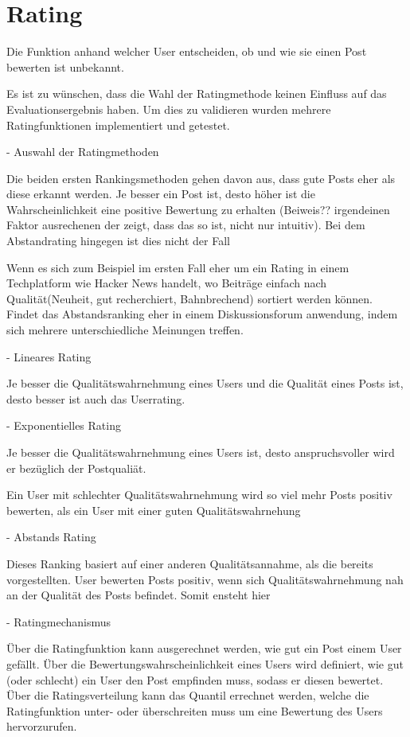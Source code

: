 \chapter{Rating}


Die Funktion anhand welcher User entscheiden, ob und wie sie einen Post bewerten ist unbekannt. 

Es ist zu wünschen, dass die Wahl der Ratingmethode keinen Einfluss auf das Evaluationsergebnis haben.
Um dies zu validieren wurden mehrere Ratingfunktionen implementiert und getestet.

 


- Auswahl der Ratingmethoden


Die beiden ersten Rankingsmethoden gehen davon aus, dass gute Posts eher als diese erkannt werden. Je besser ein Post ist, desto höher ist die Wahrscheinlichkeit eine positive Bewertung zu erhalten (Beiweis?? irgendeinen Faktor ausrechenen der zeigt, dass das so ist, nicht nur intuitiv). Bei dem Abstandrating hingegen ist dies nicht der Fall

Wenn es sich zum Beispiel im ersten Fall eher um ein Rating in einem Techplatform wie Hacker News handelt, wo Beiträge einfach nach Qualität(Neuheit, gut recherchiert, Bahnbrechend) sortiert werden können.  Findet das Abstandsranking eher in einem Diskussionsforum anwendung, indem sich mehrere unterschiedliche Meinungen treffen.


- Lineares Rating

Je besser die Qualitätswahrnehmung eines Users und die Qualität eines Posts ist, desto besser ist auch das Userrating.


- Exponentielles Rating

Je besser die Qualitätswahrnehmung eines Users ist, desto anspruchsvoller wird er bezüglich der Postqualiät.

Ein User mit schlechter Qualitätswahrnehmung wird so viel mehr Posts  positiv bewerten, als ein User mit einer guten Qualitätswahrnehung



- Abstands Rating

Dieses Ranking basiert auf einer anderen Qualitätsannahme, als die bereits vorgestellten. User bewerten Posts positiv, wenn sich Qualitätswahrnehmung nah an der Qualität des Posts befindet. Somit ensteht hier 


- Ratingmechanismus


Über die Ratingfunktion kann ausgerechnet werden, wie gut ein Post einem User gefällt. Über die Bewertungswahrscheinlichkeit eines Users wird definiert, wie gut (oder schlecht) ein User den Post empfinden muss, sodass er diesen bewertet.  Über die Ratingsverteilung kann das Quantil errechnet werden, welche die Ratingfunktion unter- oder überschreiten muss um eine Bewertung des Users hervorzurufen.
